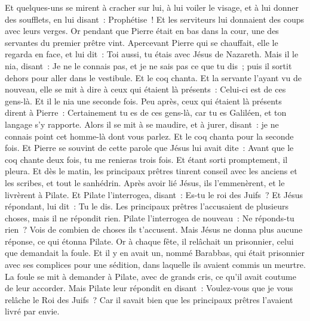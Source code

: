 \begin{multicols}{2}
Et quelques-uns se mirent à cracher sur lui, à lui voiler le visage, et à lui donner des soufflets, en lui disant~: Prophétise~! Et les serviteurs lui donnaient des coups avec leurs verges.
Or pendant que Pierre était en bas dans la cour, une des servantes du premier prêtre vint.
Apercevant Pierre qui se chauffait, elle le regarda en face, et lui dit~: Toi aussi, tu étais avec Jésus de Nazareth.
Mais il le nia, disant~: Je ne le connais pas, et je ne sais pas ce que tu dis~; puis il sortit dehors pour aller dans le vestibule. Et le coq chanta.
Et la servante l'ayant vu de nouveau, elle se mit à dire à ceux qui étaient là présents~: Celui-ci est de ces gens-là. Et il le nia une seconde fois.
Peu après, ceux qui étaient là présents dirent à Pierre~: Certainement tu es de ces gens-là, car tu es Galiléen, et ton langage s'y rapporte.
Alors il se mit à se maudire, et à jurer, disant~: je ne connais point cet homme-là dont vous parlez.
Et le coq chanta pour la seconde fois. Et Pierre se souvint de cette parole que Jésus lui avait dite~: Avant que le coq chante deux fois, tu me renieras trois fois. Et étant sorti promptement, il pleura.
\VerseOne{}Et dès le matin, les principaux prêtres tinrent conseil avec les anciens et les scribes, et tout le sanhédrin. Après avoir lié Jésus, ils l'emmenèrent, et le livrèrent à Pilate.
Et Pilate l'interrogea, disant~: Es-tu le roi des Juifs~? Et Jésus répondant, lui dit~: Tu le dis.
Les principaux prêtres l'accusaient de plusieurs choses, mais il ne répondit rien.
Pilate l'interrogea de nouveau~: Ne réponds-tu rien~? Vois de combien de choses ils t'accusent.
Mais Jésus ne donna plus aucune réponse, ce qui étonna Pilate.
Or à chaque fête, il relâchait un prisonnier, celui que demandait la foule.
Et il y en avait un, nommé Barabbas, qui était prisonnier avec ses complices pour une sédition, dans laquelle ils avaient commis un meurtre.
La foule se mit à demander à Pilate, avec de grands cris, ce qu'il avait coutume de leur accorder.
Mais Pilate leur répondit en disant~: Voulez-vous que je vous relâche le Roi des Juifs~?
Car il savait bien que les principaux prêtres l'avaient livré par envie.

\end{multicols}
